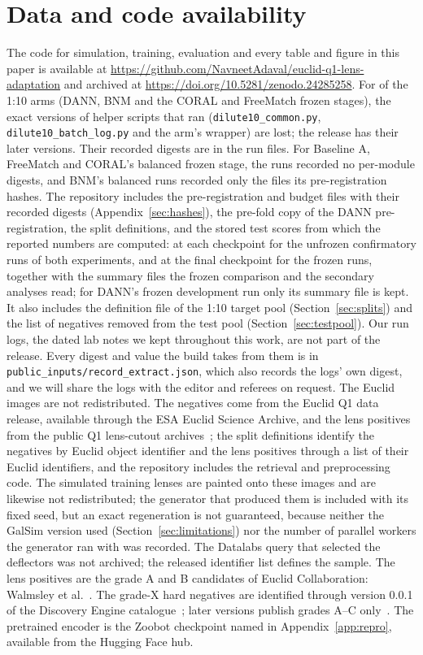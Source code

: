 \documentclass[11pt,a4paper]{article}
\begin{document}
\section*{Data and code availability}
The code for simulation, training, evaluation and every table and figure in this paper is
available at \url{https://github.com/NavneetAdaval/euclid-q1-lens-adaptation} and archived at
\url{https://doi.org/10.5281/zenodo.24285258}. For \dlLostArmsWord{} of the 1:10 arms (DANN, BNM and the CORAL and FreeMatch frozen
stages), the exact versions of \dlLostFilesWord{} helper scripts that ran
(\texttt{dilute10\_common.py}, \texttt{dilute10\_batch\_log.py} and the arm's wrapper) are lost;
the release has their later versions. Their recorded digests are in the run files. For
Baseline A, FreeMatch and CORAL's balanced frozen stage, the runs recorded no per-module digests,
and BNM's balanced runs recorded only the files its pre-registration hashes. The
repository includes the pre-registration and budget files with their recorded digests
(Appendix~\ref{sec:hashes}), the pre-fold copy of the DANN pre-registration, the split
definitions, and the stored test scores from which the reported numbers are computed:
at each checkpoint for the unfrozen confirmatory runs of both experiments, and at the final
checkpoint for the frozen runs, together with the summary files the frozen comparison and the
secondary analyses read; for DANN's frozen development run only its summary file is kept. It
also includes the definition file of the 1:10 target pool (Section~\ref{sec:splits}) and the
list of negatives removed from the test pool (Section~\ref{sec:testpool}). Our run logs, the
dated lab notes we kept throughout this work, are not part of the release. Every digest and
value the build takes from them is in \texttt{public\_inputs/\allowbreak record\_extract.json},
which also records the logs' own digest, and we will share the logs with the editor and
referees on request. The
Euclid images are not redistributed. The negatives come from the Euclid Q1 data release,
available through the ESA Euclid Science Archive, and the lens positives from the public
Q1 lens-cutout archives~\citep{discoveryenginecat}; the split definitions identify the negatives by Euclid object
identifier and the lens positives through a list of their Euclid identifiers, and the
repository includes the retrieval and preprocessing code. The simulated training lenses
are painted onto these images and are likewise not redistributed; the generator that
produced them is included with its fixed seed, but an exact regeneration is not
guaranteed, because neither the GalSim version used (Section~\ref{sec:limitations}) nor
the number of parallel workers the generator ran with was recorded. The Datalabs query that
selected the deflectors was not archived; the released identifier list defines the sample.
The lens positives are the grade A and B
candidates of Euclid Collaboration: Walmsley et al.~\citep{discoveryengineA}. The grade-X hard negatives are identified through
version 0.0.1 of the Discovery Engine catalogue~\citep{discoveryenginecat001}; later versions
publish grades A--C only~\citep{discoveryenginecat}. The pretrained encoder is the Zoobot checkpoint
named in Appendix~\ref{app:repro}, available from the Hugging Face hub.
\end{document}
